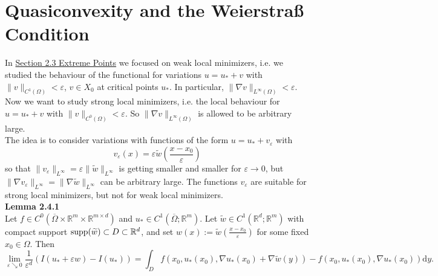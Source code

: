 \section{Quasiconvexity and the Weierstra{\ss} Condition}
In \hyperref[sec:mcov_chap2_sec3]{Section 2.3 Extreme Points} we focused on weak local minimizers, i.e. we studied the behaviour of the functional for variations $u=u_*+v$ with $\lVert v\rVert_{C^1(\Omega)}<\varepsilon$, $v\in X_0$ at critical points $u_*$. In particular, $\lVert\nabla v\rVert_{L^\infty(\Omega)}<\varepsilon$. Now we want to study strong local minimizers, i.e. the local behaviour for $u=u_*+v$ with $\lVert v\rVert_{C^0(\Omega)}<\varepsilon$. So $\lVert\nabla v\rVert_{L^\infty(\Omega)}$ is allowed to be arbitrary large.\\

The idea is to consider variations with functions of the form $u=u_*+v_\varepsilon$ with
\[v_\varepsilon(x)=\varepsilon\widetilde{w}\left(\frac{x-x_0}{\varepsilon}\right)\]
so that $\lVert v_\varepsilon\rVert_{L^\infty}=\varepsilon\lVert\widetilde{w}\rVert_{L^\infty}$ is getting smaller and smaller for $\varepsilon\to0$, but $\lVert\nabla v_\varepsilon\rVert_{L^\infty}=\lVert\nabla\widetilde{w}\rVert_{L^\infty}$ can be arbitrary large. The functions $v_\varepsilon$ are suitable for strong local minimizers, but not for weak local minimizers.\\[11pt]

\hypertarget{lemma_2_4_1}{\textbf{Lemma 2.4.1}}\\
Let $f\in C^0(\overline{\Omega}\times\mathbb{R}^m\times\mathbb{R}^{m\times d})$ and $u_*\in C^1(\overline{\Omega};\mathbb{R}^m)$. Let $\widetilde{w}\in C^1(\mathbb{R}^d;\mathbb{R}^m)$ with compact support $\operatorname{supp}\mathopen{}\left(\widetilde{w}\right)\mathclose{}\subset D\subset\mathbb{R}^d$, and set $w(x):=\widetilde{w}\left(\frac{x-x_0}{\varepsilon}\right)$ for some fixed $x_0\in\Omega$. Then
\[\lim_{\varepsilon\searrow0}{\frac{1}{\varepsilon^d}\left(I(u_*+\varepsilon w)-I(u_*)\right)}=\int_D{f(x_0,u_*(x_0),\nabla u_*(x_0)+\nabla\widetilde{w}(y))-f(x_0,u_*(x_0),\nabla u_*(x_0))\mathrm{d}y}.\]\\

